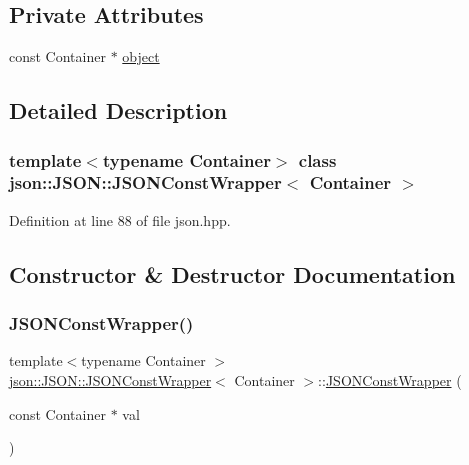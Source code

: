 \subsection*{Private Attributes}
\begin{DoxyCompactItemize}
\item 
const Container $\ast$ \mbox{\hyperlink{classjson_1_1_j_s_o_n_1_1_j_s_o_n_const_wrapper_a945ba0baef716a60327d5e4b871f9a42}{object}}
\end{DoxyCompactItemize}


\subsection{Detailed Description}
\subsubsection*{template$<$typename Container$>$\newline
class json\+::\+J\+S\+O\+N\+::\+J\+S\+O\+N\+Const\+Wrapper$<$ Container $>$}



Definition at line 88 of file json.\+hpp.



\subsection{Constructor \& Destructor Documentation}
\mbox{\label{classjson_1_1_j_s_o_n_1_1_j_s_o_n_const_wrapper_ae7b5a3300a9ddb3149bc3195285c68ba}} 
\subsubsection{\texorpdfstring{J\+S\+O\+N\+Const\+Wrapper()}{JSONConstWrapper()}\hspace{0.1cm}{\footnotesize\ttfamily [1/2]}}
{\footnotesize\ttfamily template$<$typename Container $>$ \\
\mbox{\hyperlink{classjson_1_1_j_s_o_n_1_1_j_s_o_n_const_wrapper}{json\+::\+J\+S\+O\+N\+::\+J\+S\+O\+N\+Const\+Wrapper}}$<$ Container $>$\+::\mbox{\hyperlink{classjson_1_1_j_s_o_n_1_1_j_s_o_n_const_wrapper}{J\+S\+O\+N\+Const\+Wrapper}} (\begin{DoxyParamCaption}\item[{const Container $\ast$}]{val }\end{DoxyParamCaption})\hspace{0.3cm}{\ttfamily [inline]}}



